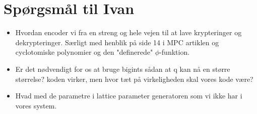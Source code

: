 \documentclass[12px]{article}
\begin{document}
    \section*{Spørgsmål til Ivan}
    \begin{itemize}
        \item Hvordan encoder vi fra en streng og hele vejen til at lave krypteringer
            og dekrypteringer. Særligt med henblik på side 14 i MPC artiklen og cyclotomiske
            polynomier og den "definerede" $\phi$-funktion.

        \item Er det nødvendigt for os at bruge bigints sådan at q kan nå en større størrelse?
            koden virker, men hvor tæt på virkeligheden skal vores kode være?

        \item Hvad med de parametre i lattice parameter generatoren som vi ikke har i vores system.
    \end{itemize}
\end{document}

